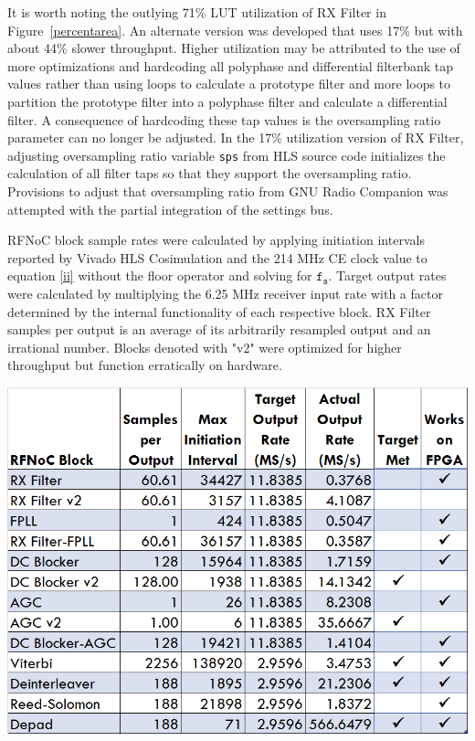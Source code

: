 \documentclass{article}
\begin{document}
It is worth noting the outlying 71\% LUT utilization of RX Filter in Figure~\ref{percentarea}. An alternate version was developed that uses 17\% but with about 44\% slower throughput. Higher utilization may be attributed to the use of more optimizations and hardcoding all polyphase and differential filterbank tap values rather than using loops to calculate a prototype filter and more loops to partition the prototype filter into a polyphase filter and calculate a differential filter. A consequence of hardcoding these tap values is the oversampling ratio parameter can no longer be adjusted. In the 17\% utilization version of RX Filter, adjusting oversampling ratio variable {\tt sps} from HLS source code initializes the calculation of all filter taps so that they support the oversampling ratio. Provisions to adjust that oversampling ratio from GNU Radio Companion was attempted with the partial integration of the settings bus.

\begin{table}[h]
  \begin{center}
    \caption{RFNoC block sample rates were calculated by applying initiation intervals reported by Vivado HLS Cosimulation and the 214 MHz CE clock value to equation \ref{ii} without the floor operator and solving for $\mathtt{f_{s}}$. Target output rates were calculated by multiplying the 6.25 MHz receiver input rate with a factor determined by the internal functionality of each respective block. RX Filter samples per output is an average of its arbitrarily resampled output and an irrational number. Blocks denoted with "v2" were optimized for higher throughput but function erratically on hardware.\\
    }
    \centerline{\includegraphics[width=\columnwidth]{rates.png}}
    \label{rates}
  \end{center}
\end{table}
\end{document}
